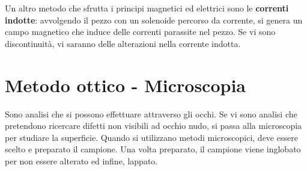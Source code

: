 Un altro metodo che sfrutta i principi magnetici ed elettrici sono le \textbf{correnti indotte}: avvolgendo il pezzo con un solenoide percorso da corrente, si genera un campo magnetico che induce delle correnti parassite nel pezzo. Se vi sono discontinuità, vi saranno delle alterazioni nella corrente indotta.

\section{Metodo ottico - Microscopia}

Sono analisi che si possono effettuare attraverso gli occhi. Se vi sono analisi che pretendono ricercare difetti non visibili ad occhio nudo, si passa alla microscopia per studiare la superficie. Quando si utilizzano metodi microscopici, deve essere scelto e preparato il campione. Una volta preparato, il campione viene inglobato per non essere alterato ed infine, lappato.